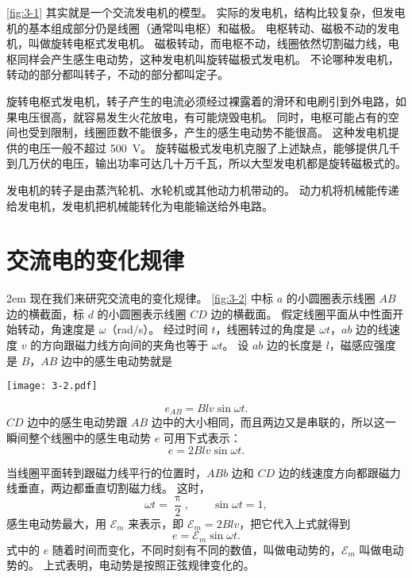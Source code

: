 \cref{fig:3-1} 其实就是一个交流发电机的模型。
实际的发电机，结构比较复杂，但发电机的基本组成部分仍是线圈（通常叫电枢）和磁极。
电枢转动、磁极不动的发电机，叫做旋转电枢式发电机。
磁极转动，而电枢不动，线圈依然切割磁力线，电枢同样会产生感生电动势，这种发电机叫旋转磁极式发电机。
不论哪种发电机，转动的部分都叫转子，不动的部分都叫定子。

旋转电枢式发电机，转子产生的电流必须经过裸露着的滑环和电刷引到外电路，如果电压很高，就容易发生火花放电，有可能烧毁电机。
同时，电枢可能占有的空间也受到限制，线圈匝数不能很多，产生的感生电动势不能很高。
这种发电机提供的电压一般不超过 \qty{500}{V}。
旋转磁极式发电机克服了上述缺点，能够提供几千到几万伏的电压，输出功率可达几十万千瓦，所以大型发电机都是旋转磁极式的。

发电机的转子是由蒸汽轮机、水轮机或其他动力机带动的。
动力机将机械能传递给发电机，发电机把机械能转化为电能输送给外电路。

\section{交流电的变化规律}

\medskip\noindent
\begin{minipage}{0.58\linewidth}\parindent2em
现在我们来研究交流电的变化规律。
\cref{fig:3-2} 中标 $a$ 的小圆圈表示线圈 $AB$ 边的横截面，标 $d$ 的小圆圈表示线圈 $CD$ 边的横截面。
假定线圈平面从中性面开始转动，角速度是 $\omega$（\unit{rad/s}）。
经过时间 $t$，线圈转过的角度是 $\omega t$，$ab$ 边的线速度 $v$ 的方向跟磁力线方向间的夹角也等于 $\omega t$。
设 $ab$ 边的长度是 $l$，磁感应强度是 $B$，$AB$ 边中的感生电动势就是
\end{minipage}\hfill
\begin{minipage}{0.37\linewidth}\centering
  \begin{figurehere}
    \texttt{[image: 3-2.pdf]}
    \caption{}\label{fig:3-2}
  \end{figurehere}
\end{minipage}\par\medskip
\[e_{AB}=Bl v\sin \omega t.\]
$CD$ 边中的感生电动势跟 $AB$ 边中的大小相同，而且两边又是串联的，所以这一瞬间整个线圈中的感生电动势 $e$ 可用下式表示：
\[e=2Bl v\sin \omega t.\]

当线圈平面转到跟磁力线平行的位置时，$ABb$ 边和 $CD$ 边的线速度方向都跟磁力线垂直，两边都垂直切割磁力线。
这时，
\[\omega t=\frac{\uppi}{2},\qquad \sin \omega t=1,\]
感生电动势最大，用 $\mathcal{E}_m$ 来表示，即 $\mathcal{E}_m=2Bl v$，把它代入上式就得到
\begin{equation}
  \label{eq:func_e_zero_omega}
  e=\mathcal{E}_m \sin\omega t.
\end{equation}
式中的 $e$ 随着时间而变化，不同时刻有不同的数值，叫做电动势的，$\mathcal{E}_m$ 叫做电动势的。
上式表明，电动势是按照正弦规律变化的。


